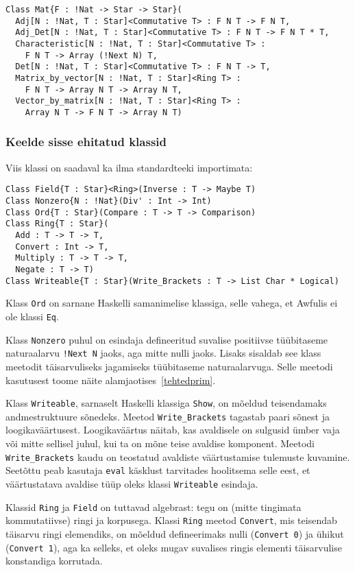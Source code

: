 \documentclass[12pt]{article}
\begin{document}
        \begin{verbatim}Class Mat{F : !Nat -> Star -> Star}(
  Adj[N : !Nat, T : Star]<Commutative T> : F N T -> F N T,
  Adj_Det[N : !Nat, T : Star]<Commutative T> : F N T -> F N T * T,
  Characteristic[N : !Nat, T : Star]<Commutative T> :
    F N T -> Array (!Next N) T,
  Det[N : !Nat, T : Star]<Commutative T> : F N T -> T,
  Matrix_by_vector[N : !Nat, T : Star]<Ring T> :
    F N T -> Array N T -> Array N T,
  Vector_by_matrix[N : !Nat, T : Star]<Ring T> :
    Array N T -> F N T -> Array N T)\end{verbatim}
      \subsubsection{Keelde sisse ehitatud klassid}
        Viis klassi on saadaval ka ilma standardteeki importimata:

        \begin{verbatim}Class Field{T : Star}<Ring>(Inverse : T -> Maybe T)
Class Nonzero{N : !Nat}(Div' : Int -> Int)
Class Ord{T : Star}(Compare : T -> T -> Comparison)
Class Ring{T : Star}(
  Add : T -> T -> T,
  Convert : Int -> T,
  Multiply : T -> T -> T,
  Negate : T -> T)
Class Writeable{T : Star}(Write_Brackets : T -> List Char * Logical)\end{verbatim}

        Klass \verb!Ord! on sarnane Haskelli samanimelise klassiga, selle vahega, et Awfulis ei ole klassi \verb!Eq!.

        Klass \verb!Nonzero! puhul on esindaja defineeritud suvalise positiivse tüübitaseme naturaalarvu \verb"!Next N" jaoks, aga mitte nulli jaoks. Lisaks sisaldab see klass meetodit täisarvuliseks jagamiseks tüübitaseme naturaalarvuga. Selle meetodi kasutusest toome näite alamjaotises~\ref{tehtedprim}.

        Klass \verb!Writeable!, sarnaselt Haskelli klassiga \verb!Show!, on mõeldud teisendamaks andmestruktuure sõnedeks. Meetod \verb!Write_Brackets! tagastab paari sõnest ja loogikaväärtusest. Loogikaväärtus näitab, kas avaldisele on sulgusid ümber vaja või mitte sellisel juhul, kui ta on mõne teise avaldise komponent. Meetodi \verb!Write_Brackets! kaudu on teostatud avaldiste väärtustamise tulemuste kuvamine. Seetõttu peab kasutaja \verb!eval! käsklust tarvitades hoolitsema selle eest, et väärtustatava avaldise tüüp oleks klassi \verb!Writeable! esindaja.

        Klassid \verb!Ring! ja \verb!Field! on tuttavad algebrast: tegu on (mitte tingimata kommutatiivse) ringi ja korpusega. Klassi \verb!Ring! meetod \verb!Convert!, mis teisendab täisarvu ringi elemendiks, on mõeldud defineerimaks nulli (\verb!Convert 0!) ja ühikut (\verb!Convert 1!), aga ka selleks, et oleks mugav suvalises ringis elementi täisarvulise konstandiga korrutada.
\end{document}
